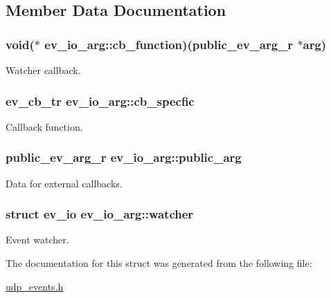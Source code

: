 \subsection{\-Member \-Data \-Documentation}
\hypertarget{structev__io__arg_abaa257f67d6cfdbe32520b8cc4e8d3c5}{
\subsubsection[{cb\-\_\-function}]{\setlength{\rightskip}{0pt plus 5cm}void($\ast$ {\bf ev\-\_\-io\-\_\-arg\-::cb\-\_\-function})(public\-\_\-ev\-\_\-arg\-\_\-r $\ast$arg)}}\label{structev__io__arg_abaa257f67d6cfdbe32520b8cc4e8d3c5}
\-Watcher callback. \hypertarget{structev__io__arg_af055bf020c5760fb46c3b6a158df561f}{
\subsubsection[{cb\-\_\-specfic}]{\setlength{\rightskip}{0pt plus 5cm}ev\-\_\-cb\-\_\-tr {\bf ev\-\_\-io\-\_\-arg\-::cb\-\_\-specfic}}}\label{structev__io__arg_af055bf020c5760fb46c3b6a158df561f}
\-Callback function. \hypertarget{structev__io__arg_a18b44fe3cd02062cef68cfa6f029bda0}{
\subsubsection[{public\-\_\-arg}]{\setlength{\rightskip}{0pt plus 5cm}public\-\_\-ev\-\_\-arg\-\_\-r {\bf ev\-\_\-io\-\_\-arg\-::public\-\_\-arg}}}\label{structev__io__arg_a18b44fe3cd02062cef68cfa6f029bda0}
\-Data for external callbacks. \hypertarget{structev__io__arg_ac9df307e50111f96bcf5d726d54cb574}{
\subsubsection[{watcher}]{\setlength{\rightskip}{0pt plus 5cm}struct ev\-\_\-io {\bf ev\-\_\-io\-\_\-arg\-::watcher}}}\label{structev__io__arg_ac9df307e50111f96bcf5d726d54cb574}
\-Event watcher. 

\-The documentation for this struct was generated from the following file\-:\begin{DoxyCompactItemize}
\item 
\hyperlink{udp__events_8h}{udp\-\_\-events.\-h}\end{DoxyCompactItemize}
